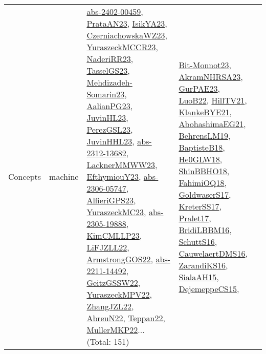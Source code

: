{\begin{longtable}{lp{3cm}>{\raggedright}p{6cm}>{\raggedright}p{6cm}p{8cm}}
Concepts & machine & \href{articles/abs-2402-00459.pdf}{abs-2402-00459}\cite{abs-2402-00459}, \href{articles/PrataAN23.pdf}{PrataAN23}\cite{PrataAN23}, \href{articles/IsikYA23.pdf}{IsikYA23}\cite{IsikYA23}, \href{articles/CzerniachowskaWZ23.pdf}{CzerniachowskaWZ23}\cite{CzerniachowskaWZ23}, \href{articles/YuraszeckMCCR23.pdf}{YuraszeckMCCR23}\cite{YuraszeckMCCR23}, \href{articles/NaderiRR23.pdf}{NaderiRR23}\cite{NaderiRR23}, \href{papers/TasselGS23.pdf}{TasselGS23}\cite{TasselGS23}, \href{papers/Mehdizadeh-Somarin23.pdf}{Mehdizadeh-Somarin23}\cite{Mehdizadeh-Somarin23}, \href{papers/AalianPG23.pdf}{AalianPG23}\cite{AalianPG23}, \href{papers/JuvinHL23.pdf}{JuvinHL23}\cite{JuvinHL23}, \href{papers/PerezGSL23.pdf}{PerezGSL23}\cite{PerezGSL23}, \href{papers/JuvinHHL23.pdf}{JuvinHHL23}\cite{JuvinHHL23}, \href{articles/abs-2312-13682.pdf}{abs-2312-13682}\cite{abs-2312-13682}, \href{articles/LacknerMMWW23.pdf}{LacknerMMWW23}\cite{LacknerMMWW23}, \href{papers/EfthymiouY23.pdf}{EfthymiouY23}\cite{EfthymiouY23}, \href{articles/abs-2306-05747.pdf}{abs-2306-05747}\cite{abs-2306-05747}, \href{articles/AlfieriGPS23.pdf}{AlfieriGPS23}\cite{AlfieriGPS23}, \href{papers/YuraszeckMC23.pdf}{YuraszeckMC23}\cite{YuraszeckMC23}, \href{articles/abs-2305-19888.pdf}{abs-2305-19888}\cite{abs-2305-19888}, \href{papers/KimCMLLP23.pdf}{KimCMLLP23}\cite{KimCMLLP23}, \href{papers/LiFJZLL22.pdf}{LiFJZLL22}\cite{LiFJZLL22}, \href{papers/ArmstrongGOS22.pdf}{ArmstrongGOS22}\cite{ArmstrongGOS22}, \href{articles/abs-2211-14492.pdf}{abs-2211-14492}\cite{abs-2211-14492}, \href{papers/GeitzGSSW22.pdf}{GeitzGSSW22}\cite{GeitzGSSW22}, \href{articles/YuraszeckMPV22.pdf}{YuraszeckMPV22}\cite{YuraszeckMPV22}, \href{papers/ZhangJZL22.pdf}{ZhangJZL22}\cite{ZhangJZL22}, \href{articles/AbreuN22.pdf}{AbreuN22}\cite{AbreuN22}, \href{papers/Teppan22.pdf}{Teppan22}\cite{Teppan22}, \href{articles/MullerMKP22.pdf}{MullerMKP22}\cite{MullerMKP22}... (Total: 151) & \href{papers/Bit-Monnot23.pdf}{Bit-Monnot23}\cite{Bit-Monnot23}, \href{articles/AkramNHRSA23.pdf}{AkramNHRSA23}\cite{AkramNHRSA23}, \href{articles/GurPAE23.pdf}{GurPAE23}\cite{GurPAE23}, \href{papers/LuoB22.pdf}{LuoB22}\cite{LuoB22}, \href{papers/HillTV21.pdf}{HillTV21}\cite{HillTV21}, \href{papers/KlankeBYE21.pdf}{KlankeBYE21}\cite{KlankeBYE21}, \href{articles/AbohashimaEG21.pdf}{AbohashimaEG21}\cite{AbohashimaEG21}, \href{papers/BehrensLM19.pdf}{BehrensLM19}\cite{BehrensLM19}, \href{articles/BaptisteB18.pdf}{BaptisteB18}\cite{BaptisteB18}, \href{papers/He0GLW18.pdf}{He0GLW18}\cite{He0GLW18}, \href{articles/ShinBBHO18.pdf}{ShinBBHO18}\cite{ShinBBHO18}, \href{articles/FahimiOQ18.pdf}{FahimiOQ18}\cite{FahimiOQ18}, \href{papers/GoldwaserS17.pdf}{GoldwaserS17}\cite{GoldwaserS17}, \href{articles/KreterSS17.pdf}{KreterSS17}\cite{KreterSS17}, \href{papers/Pralet17.pdf}{Pralet17}\cite{Pralet17}, \href{papers/BridiLBBM16.pdf}{BridiLBBM16}\cite{BridiLBBM16}, \href{papers/SchuttS16.pdf}{SchuttS16}\cite{SchuttS16}, \href{papers/CauwelaertDMS16.pdf}{CauwelaertDMS16}\cite{CauwelaertDMS16}, \href{articles/ZarandiKS16.pdf}{ZarandiKS16}\cite{ZarandiKS16}, \href{papers/SialaAH15.pdf}{SialaAH15}\cite{SialaAH15}, \href{papers/DejemeppeCS15.pdf}{DejemeppeCS15}\cite{DejemeppeCS15}, 
\end{longtable}}
